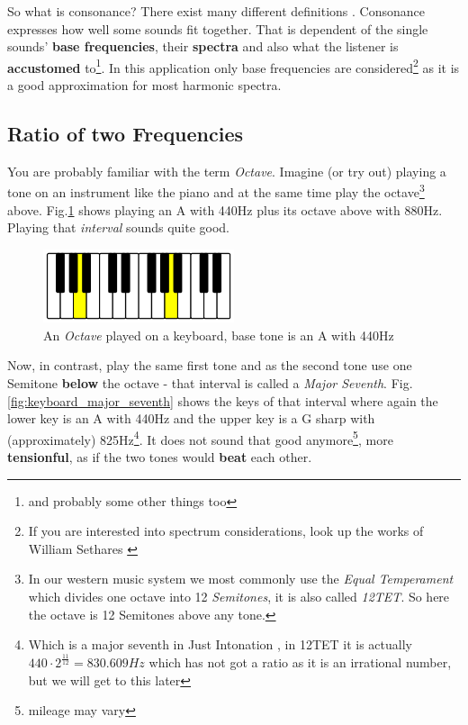 \documentclass[12pt,a4paper,titlepage,oneside]{report}
\begin{document}
So what is consonance? There exist many different definitions \cite{bib:cons_diss}. Consonance expresses how well some sounds fit together. That is dependent of the single sounds' \textbf{base frequencies}, their \textbf{spectra} and also what the listener is \textbf{accustomed} to\footnote{and probably some other things too}. In this application only base frequencies are considered\footnote{If you are interested into spectrum considerations, look up the works of William Sethares \cite{bib:sethWiki, bib:adaptun}} as it is a good approximation for most harmonic spectra.


\subsection{Ratio of two Frequencies}

You are probably familiar with the term \textit{Octave}. Imagine (or try out) playing a tone on an instrument like the piano and at the same time play the octave\footnote{In our western music system we most commonly use the \textit{Equal Temperament} \cite{bib:12tet} which divides one octave into 12 \textit{Semitones}, it is also called \textit{12TET}. So here the octave is 12 Semitones above any tone.} above. Fig.\ref{fig:keyboard_octave} shows playing an A with 440Hz plus its octave above with 880Hz. Playing that \textit{interval} sounds quite good.

\begin{figure}[!ht]
\includegraphics[width=0.5\textwidth]{images/keyboard_octave.png}
\centering
\caption{An \textit{Octave} played on a keyboard, base tone is an A with 440Hz}
\label{fig:keyboard_octave}
\end{figure}

Now, in contrast, play the same first tone and as the second tone use one Semitone \textbf{below} the octave - that interval is called a \textit{Major Seventh}. Fig.\ref{fig:keyboard_major_seventh} shows the keys of that interval where again the lower key is an A with 440Hz and the upper key is a G sharp with (approximately) 825Hz\footnote{Which is a major seventh in Just Intonation \cite{bib:just}, in 12TET it is actually $440 \cdot 2^{\frac{11}{12}} = 830.609Hz$ which has not got a ratio as it is an irrational number, but we will get to this later}. It does not sound that good anymore\footnote{mileage may vary}, more \textbf{tensionful}, as if the two tones would \textbf{beat} each other.
\end{document}
